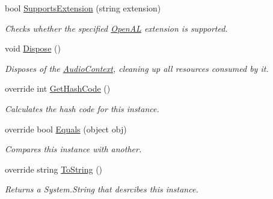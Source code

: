 \begin{DoxyCompactItemize}
bool \hyperlink{class_open_t_k_1_1_audio_1_1_audio_context_a3bbbeadd712d216f9092f87713e0c5e6}{Supports\-Extension} (string extension)
\begin{DoxyCompactList}\small\item\em Checks whether the specified \hyperlink{namespace_open_t_k_1_1_audio_1_1_open_a_l}{Open\-A\-L} extension is supported. \end{DoxyCompactList}\item 
void \hyperlink{class_open_t_k_1_1_audio_1_1_audio_context_a9c824f8429d084efb010a662f032fd93}{Dispose} ()
\begin{DoxyCompactList}\small\item\em Disposes of the \hyperlink{class_open_t_k_1_1_audio_1_1_audio_context}{Audio\-Context}, cleaning up all resources consumed by it. \end{DoxyCompactList}\item 
override int \hyperlink{class_open_t_k_1_1_audio_1_1_audio_context_a708a651ebbac9237b0db78a2ced332a6}{Get\-Hash\-Code} ()
\begin{DoxyCompactList}\small\item\em Calculates the hash code for this instance. \end{DoxyCompactList}\item 
override bool \hyperlink{class_open_t_k_1_1_audio_1_1_audio_context_a0b960cc160220ccef7d58f1c0c6727ae}{Equals} (object obj)
\begin{DoxyCompactList}\small\item\em Compares this instance with another. \end{DoxyCompactList}\item 
override string \hyperlink{class_open_t_k_1_1_audio_1_1_audio_context_a06065d4fd3854dd2a446c6237cf77616}{To\-String} ()
\begin{DoxyCompactList}\small\item\em Returns a System.\-String that desrcibes this instance. \end{DoxyCompactList}\end{DoxyCompactItemize}
